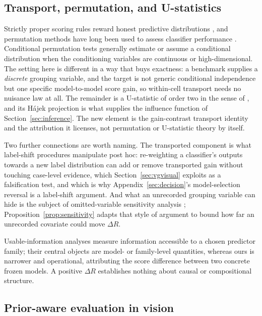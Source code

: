 \subsection{Transport, permutation, and U-statistics}\label{sec:related-perm}

Strictly proper scoring rules reward honest predictive distributions
\citep{gneiting2007proper}, and permutation methods have long been used to assess classifier
performance \citep{ojala2010permutation}. Conditional permutation tests generally estimate
or assume a conditional distribution when the conditioning variables are continuous or
high-dimensional. The setting here is different in a way that buys exactness: a benchmark
supplies a \emph{discrete} grouping variable, and the target is not generic conditional
independence but one specific model-to-model score gain, so within-cell transport needs no
nuisance law at all. The remainder is a U-statistic of order two in the sense of
\citet{hoeffding1948class}, and its H\'ajek projection is what supplies the influence
function of Section~\ref{sec:inference}. The new element is the gain-contrast transport
identity and the attribution it licenses, not permutation or U-statistic theory by itself.

Two further connections are worth naming. The transported component is what label-shift
procedures manipulate post hoc: re-weighting a classifier's outputs towards a new label
distribution \citep{saerens2002adjusting,lipton2018detecting} can add or remove transported
gain without touching case-level evidence, which Section~\ref{sec:vgvisual} exploits as a
falsification test, and which is why Appendix~\ref{sec:decision}'s model-selection reversal
is a label-shift argument. And what an unrecorded grouping variable can hide is the subject
of omitted-variable sensitivity analysis \citep{rosenbaum2002observational};
Proposition~\ref{prop:sensitivity} adapts that style of argument to bound how far an
unrecorded covariate could move $\Delta R$.

Usable-information analyses measure information accessible to a chosen predictor family;
their central objects are model- or family-level quantities, whereas ours is narrower and
operational, attributing the score difference between two concrete frozen models. A positive
$\Delta R$ establishes nothing about causal or compositional structure.

\subsection{Prior-aware evaluation in vision}\label{sec:related-applied}

